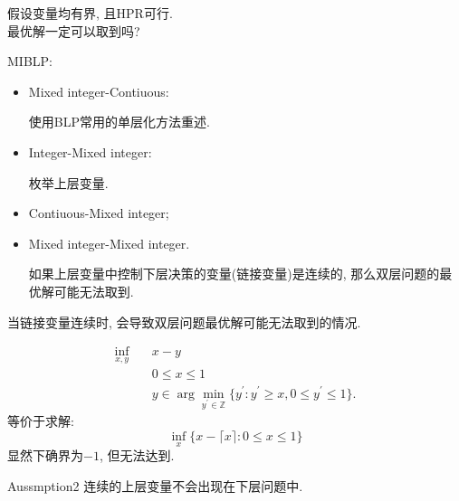 \documentclass[10pt]{beamer}
\begin{document}
\begin{frame}
	\begin{tcolorbox}
		假设变量均有界, 且HPR可行.\\
		最优解一定可以取到吗?
	\end{tcolorbox}
	MIBLP:
	\begin{itemize}
		\item Mixed integer-Contiuous:
		
		使用BLP常用的单层化方法重述.
		\item Integer-Mixed integer:
		
		枚举上层变量.
		\item Contiuous-Mixed integer;
		\item Mixed integer-Mixed integer.
		
		如果上层变量中控制下层决策的变量(链接变量)是连续的, 那么双层问题的最优解可能无法取到.
	\end{itemize}
\end{frame}

\begin{frame}
	当链接变量连续时, 会导致双层问题最优解可能无法取到的情况. 
	\begin{tcolorbox}
		\begin{equation*}
			\begin{aligned}
				\inf_{x,y}&\quad x-y\\
				&\quad0\leq x\leq1\\
				&\quad y\in\arg\min_{y^{\prime}\in\mathbb{Z}}\{y^{\prime}:y^{\prime}\geq x,0\leq y^{\prime}\leq1\}.
			\end{aligned}
		\end{equation*}
		等价于求解:
		\begin{equation*}
			\inf_x\{x-\lceil x\rceil:0\leq x\leq1\}
		\end{equation*}
		显然下确界为$-1$, 但无法达到.
	\end{tcolorbox}

	\begin{block}{Aussmption2}
		连续的上层变量不会出现在下层问题中.
	\end{block}
\end{frame}
\end{document}
